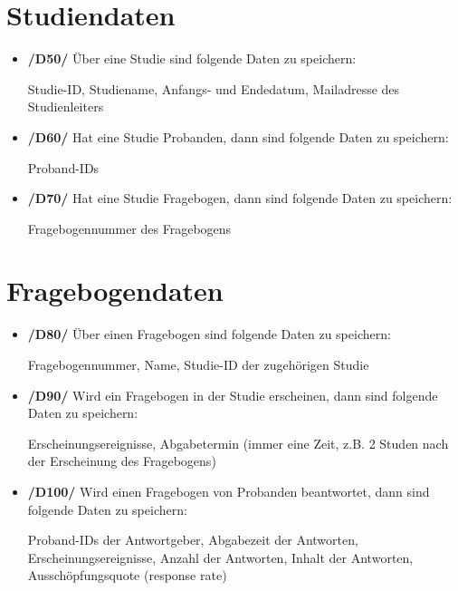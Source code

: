 \documentclass[a4paper]{scrreprt}
\begin{document}
        \section{Studiendaten}
            \begin{itemize}
                \item \textbf{/D50/} Über eine Studie sind folgende Daten zu speichern:
                    \par Studie-ID, Studiename, Anfangs- und Endedatum, Mailadresse des \gls{Studienleiter}s

                \item \textbf{/D60/} Hat eine Studie \gls{Proband}en, dann sind folgende Daten zu speichern:
                    \par \gls{Proband}-IDs

                \item \textbf{/D70/} Hat eine Studie Fragebogen, dann sind folgende Daten zu speichern:
                    \par Fragebogennummer des Fragebogens
            \end{itemize}

        \section{Fragebogendaten}
            \begin{itemize}
                \item \textbf{/D80/} Über einen Fragebogen sind folgende Daten zu speichern:
                \par Fragebogennummer, Name, Studie-ID der zugehörigen Studie

                \item \textbf{/D90/} Wird ein Fragebogen in der Studie erscheinen, dann sind folgende Daten zu speichern:
                \par Erscheinungsereignisse, Abgabetermin (immer eine Zeit, z.B. 2 Studen nach der Erscheinung des Fragebogens)

                \item \textbf{/D100/} Wird einen Fragebogen von \gls{Proband}en beantwortet, dann sind folgende Daten zu speichern:
                \par \gls{Proband}-IDs der Antwortgeber, Abgabezeit der Antworten, Erscheinungsereignisse, Anzahl der Antworten, Inhalt der Antworten, Ausschöpfungsquote (response rate)
            \end{itemize}
\end{document}
